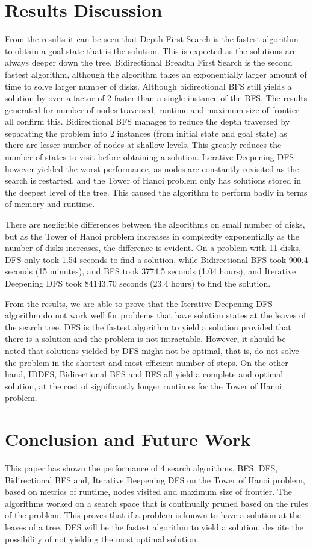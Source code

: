 \documentclass[conference]{IEEEtran}
\begin{document}
\section{Results Discussion}
From the results it can be seen that Depth First Search is the fastest algorithm to obtain a goal state that is the solution. This is expected as the solutions are always deeper down the tree. Bidirectional Breadth First Search is the second fastest algorithm, although the algorithm takes an exponentially larger amount of time to solve larger number of disks. Although bidirectional BFS still yields a solution by over a factor of 2 faster than a single instance of the BFS. The results generated for number of nodes traversed, runtime and maximum size of frontier all confirm this. Bidirectional BFS manages to reduce the depth traversed by separating the problem into 2 instances (from initial state and goal state) as there are lesser number of nodes at shallow levels. This greatly reduces the number of states to visit before obtaining a solution. Iterative Deepening DFS however yielded the worst performance, as nodes are constantly revisited as the search is restarted, and the Tower of Hanoi problem only has solutions stored in the deepest level of the tree. This caused the algorithm to perform badly in terms of memory and runtime.

There are negligible differences between the algorithms on small number of disks, but as the Tower of Hanoi problem increases in complexity exponentially as the number of disks increases, the difference is evident. On a problem with 11 disks, DFS only took 1.54 seconds to find a solution, while Bidirectional BFS took 900.4 seconds (15 minutes), and BFS took 3774.5 seconds (1.04 hours), and Iterative Deepening DFS took 84143.70 seconds (23.4 hours) to find the solution. 

From the results, we are able to prove that the Iterative Deepening DFS algorithm do not work well for problems that have solution states at the leaves of the search tree. DFS is the fastest algorithm to yield a solution provided that there is a solution and the problem is not intractable. However, it should be noted that solutions yielded by DFS might not be optimal, that is, do not solve the problem in the shortest and most efficient number of steps. On the other hand, IDDFS, Bidirectional BFS and BFS all yield a complete and optimal solution, at the cost of significantly longer runtimes for the Tower of Hanoi problem.

\section{Conclusion and Future Work}
This paper has shown the performance of 4 search algorithms, BFS, DFS, Bidirectional BFS and, Iterative Deepening DFS on the Tower of Hanoi problem, based on metrics of runtime, nodes visited and maximum size of frontier. The algorithms worked on a search space that is continually pruned based on the rules of the problem. This proves that if a problem is known to have a solution at the leaves of a tree, DFS will be the fastest algorithm to yield a solution, despite the possibility of not yielding the most optimal solution. 
\end{document}
